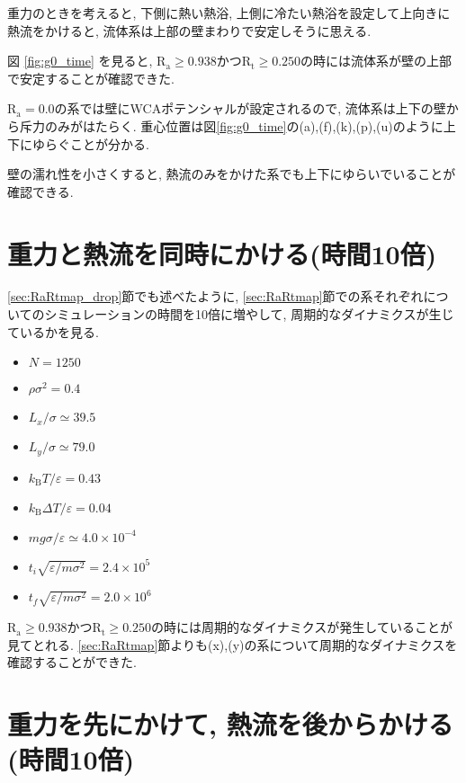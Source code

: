 

重力のときを考えると, 下側に熱い熱浴, 上側に冷たい熱浴を設定して上向きに熱流をかけると, 流体系は上部の壁まわりで安定しそうに思える.

図 \ref{fig:g0_time} を見ると, $\text{R}_\text{a} \ge 0.938 かつ \text{R}_\text{t} \ge 0.250$の時には流体系が壁の上部で安定することが確認できた.

$\text{R}_\text{a}=0.0$の系では壁にWCAポテンシャルが設定されるので, 流体系は上下の壁から斥力のみがはたらく. 重心位置は図\ref{fig:g0_time}の(a),(f),(k),(p),(u)のように上下にゆらぐことが分かる.

壁の濡れ性を小さくすると, 熱流のみをかけた系でも上下にゆらいでいることが確認できる. 

\section{重力と熱流を同時にかける(時間10倍)}\label{sec:RaRtmap10}

\ref{sec:RaRtmap_drop}節でも述べたように, \ref{sec:RaRtmap}節での系それぞれについてのシミュレーションの時間を10倍に増やして, 周期的なダイナミクスが生じているかを見る. 

\begin{itemize}
  \item $N = 1250$
  \item $\rho {\sigma}^2 = 0.4$
  \item $L_x / \sigma \simeq 39.5$
  \item $L_y / \sigma \simeq 79.0$
  \item $k_{\text{B}} T / \varepsilon = 0.43$
  \item $k_{\text{B}} \Delta T / \varepsilon = 0.04$
  \item $mg\sigma/\varepsilon \simeq 4.0 \times 10^{-4}$
  \item $t_i \sqrt{\varepsilon / m \sigma^2}= 2.4 \times 10^5$
  \item $t_f \sqrt{\varepsilon / m \sigma^2} = 2.0 \times 10^{6}$
\end{itemize}



$\text{R}_\text{a} \ge 0.938 かつ\text{R}_\text{t} \ge 0.250$の時には周期的なダイナミクスが発生していることが見てとれる. \ref{sec:RaRtmap}節よりも(x),(y)の系について周期的なダイナミクスを確認することができた. 

\section{重力を先にかけて, 熱流を後からかける(時間10倍)}\label{sec:RaRtmap10_drop}

